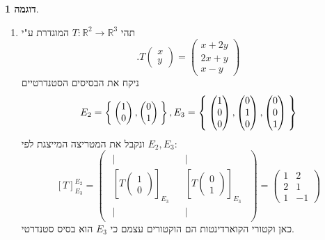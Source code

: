 \documentclass[12pt]{report}
\theoremstyle{plain}
\theoremstyle{definition}
\newtheorem{example}{דוגמה}[chapter]
\newcommand{\R}{\mathbb{R}}
\newcommand{\0}{\mathbf{0}}
\begin{document}
\begin{example}\
\begin{enumerate}[label=\alph*.]
\item
תהי
$T:\R^2\to \R^3$
המוגדרת ע"י
$$
.T\begin{pmatrix}x\\y\end{pmatrix}=\begin{pmatrix}x+2y\\2x+y\\x-y\end{pmatrix}
$$
ניקח את הבסיסים הסטנדרטיים
$$
E_2=\Set{\begin{pmatrix}1\\0\end{pmatrix},\begin{pmatrix}0\\1\end{pmatrix}},E_3=\Set{\begin{pmatrix}1\\0\\0\end{pmatrix},\begin{pmatrix}0\\1\\0\end{pmatrix},\begin{pmatrix}0\\0\\1\end{pmatrix}}
$$
ונקבל את המטריצה המייצגת לפי
$E_2,E_3$:
$$
[T]_{E_3}^{E_2}=\begin{pmatrix}\begin{array}{c}
|\\[-0.4ex]
\left[T\begin{pmatrix}1\\0\end{pmatrix}\right]_{E_3}\\[-0.4ex]
|
\end{array}
&
\begin{array}{c}
|\\[-0.4ex]
\left[T\begin{pmatrix}0\\1\end{pmatrix}\right]_{E_3}\\[-0.4ex]
|
\end{array}
\end{pmatrix}=\begin{pmatrix}
1 & 2 \\
2 & 1 \\
1 & -1
\end{pmatrix}
$$
כאן וקטורי הקוארדינטות הם הוקטורים עצמם כי 
$E_3$
הוא בסיס סטנדרטי.


\end{enumerate}
\end{example}
\end{document}
